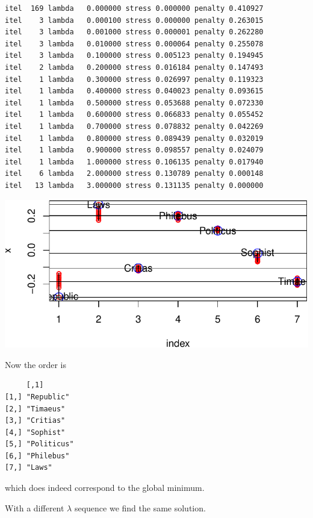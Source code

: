 \documentclass[
  12pt,
  letterpaper,
  DIV=11,
  numbers=noendperiod]{scrreprt}
\theoremstyle{remark}
\begin{document}
\begin{verbatim}
itel  169 lambda   0.000000 stress 0.000000 penalty 0.410927 
itel    3 lambda   0.000100 stress 0.000000 penalty 0.263015 
itel    3 lambda   0.001000 stress 0.000001 penalty 0.262280 
itel    3 lambda   0.010000 stress 0.000064 penalty 0.255078 
itel    3 lambda   0.100000 stress 0.005123 penalty 0.194945 
itel    2 lambda   0.200000 stress 0.016184 penalty 0.147493 
itel    1 lambda   0.300000 stress 0.026997 penalty 0.119323 
itel    1 lambda   0.400000 stress 0.040023 penalty 0.093615 
itel    1 lambda   0.500000 stress 0.053688 penalty 0.072330 
itel    1 lambda   0.600000 stress 0.066833 penalty 0.055452 
itel    1 lambda   0.700000 stress 0.078832 penalty 0.042269 
itel    1 lambda   0.800000 stress 0.089439 penalty 0.032019 
itel    1 lambda   0.900000 stress 0.098557 penalty 0.024079 
itel    1 lambda   1.000000 stress 0.106135 penalty 0.017940 
itel    6 lambda   2.000000 stress 0.130789 penalty 0.000148 
itel   13 lambda   3.000000 stress 0.131135 penalty 0.000000 
\end{verbatim}

\begin{center}
\includegraphics{global_files/figure-pdf/plato2-1.pdf}
\end{center}

Now the order is

\begin{verbatim}
     [,1]       
[1,] "Republic" 
[2,] "Timaeus"  
[3,] "Critias"  
[4,] "Sophist"  
[5,] "Politicus"
[6,] "Philebus" 
[7,] "Laws"     
\end{verbatim}

which does indeed correspond to the global minimum.

With a different \(\lambda\) sequence we find the same solution.
\end{document}
